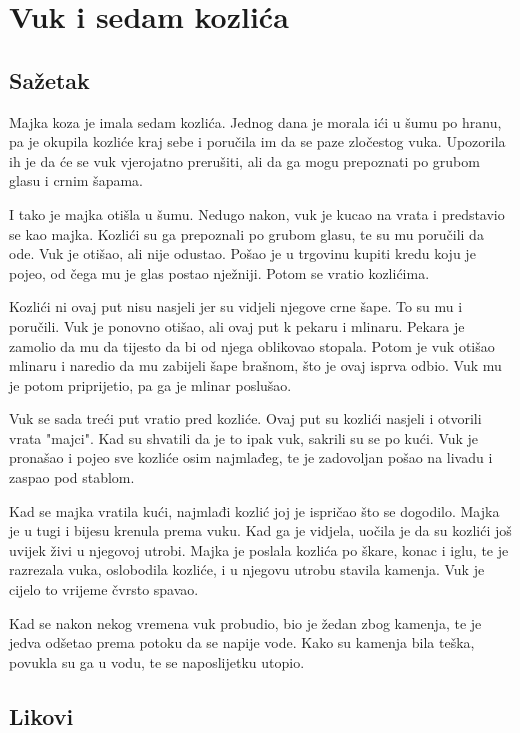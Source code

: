 \documentclass[a4paper,twoside,12pt]{memoir} %
\begin{document}
	\section{Vuk i sedam kozlića}

		\subsection{Sažetak}

		Majka koza je imala sedam kozlića. Jednog dana je morala ići u šumu po hranu, pa je okupila kozliće kraj sebe i poručila im da se paze zločestog vuka. Upozorila ih je da će se vuk vjerojatno prerušiti, ali da ga mogu prepoznati po grubom glasu i crnim šapama.

		I tako je majka otišla u šumu. Nedugo nakon, vuk je kucao na vrata i predstavio se kao majka. Kozlići su ga prepoznali po grubom glasu, te su mu poručili da ode. Vuk je otišao, ali nije odustao. Pošao je u trgovinu kupiti kredu koju je pojeo, od čega mu je glas postao nježniji. Potom se vratio kozlićima.

		Kozlići ni ovaj put nisu nasjeli jer su vidjeli njegove crne šape. To su mu i poručili. Vuk je ponovno otišao, ali ovaj put k pekaru i mlinaru. Pekara je zamolio da mu da tijesto da bi od njega oblikovao stopala. Potom je vuk otišao mlinaru i naredio da mu zabijeli šape brašnom, što je ovaj isprva odbio. Vuk mu je potom priprijetio, pa ga je mlinar poslušao.

		Vuk se sada treći put vratio pred kozliće. Ovaj put su kozlići nasjeli i otvorili vrata "majci". Kad su shvatili da je to ipak vuk, sakrili su se po kući. Vuk je pronašao i pojeo sve kozliće osim najmlađeg, te je zadovoljan pošao na livadu i zaspao pod stablom.

		Kad se majka vratila kući, najmlađi kozlić joj je ispričao što se dogodilo. Majka je u tugi i bijesu krenula prema vuku. Kad ga je vidjela, uočila je da su kozlići još uvijek živi u njegovoj utrobi. Majka je poslala kozlića po škare, konac i iglu, te je razrezala vuka, oslobodila kozliće, i u njegovu utrobu stavila kamenja. Vuk je cijelo to vrijeme čvrsto spavao.

		Kad se nakon nekog vremena vuk probudio, bio je žedan zbog kamenja, te je jedva odšetao prema potoku da se napije vode. Kako su kamenja bila teška, povukla su ga u vodu, te se naposlijetku utopio.

		\subsection{Likovi}
\end{document}
